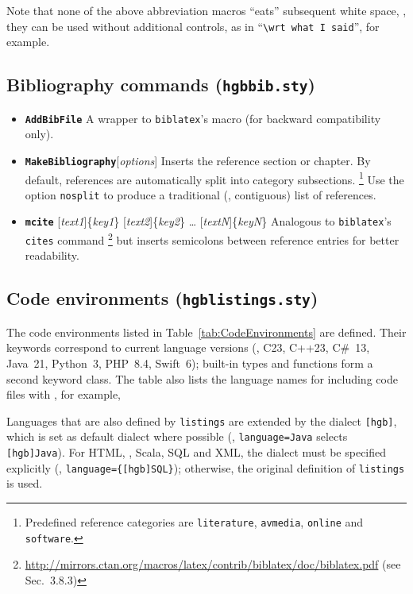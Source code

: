 \documentclass[language=english]{hgbarticle}
\begin{document}
\noindent
Note that none of the above abbreviation macros ``eats'' subsequent white
space, \ie, they can be used without additional controls, as in
``\verb!\wrt what I said!'', for example.

\subsection{Bibliography commands (\texttt{hgbbib.sty})}

\begin{itemize}
    \item 
    \textbf{\texttt{{\bs}AddBibFile}}\newline
    A wrapper to \texttt{biblatex}'s \verb!! macro (for backward compatibility only).
    \item
    \textbf{\texttt{{\bs}MakeBibliography}}[\emph{options}]
    \newline
    Inserts the
    reference section or chapter. By default, references are automatically
    split into category subsections.%
    \footnote{Predefined reference categories are \texttt{literature},
        \texttt{avmedia}, \texttt{online} and \texttt{software}.}
    Use the option \texttt{nosplit} to produce a traditional (\ie,
    contiguous) list of references.
    \item
    \textbf{\texttt{{\bs}mcite}}%
        [\emph{text1}]\{\emph{key1}\}%
        [\emph{text2}]\{\emph{key2}\}%
        \ldots
        [\emph{textN}]\{\emph{keyN}\}%
    \newline
    Analogous to \texttt{bib\-la\-tex}'s \texttt{{\bs}cites} command%
    \footnote{%
    \url{http://mirrors.ctan.org/macros/latex/contrib/biblatex/doc/biblatex.pdf}
    (see Sec.~3.8.3)} but inserts semicolons between reference entries for
    better readability.
\end{itemize}



\subsection{Code environments (\texttt{hgblistings.sty})}
\label{sec:CodeEnvironments}

The code environments listed in Table~\ref{tab:CodeEnvironments} are defined. Their keywords correspond
to current language versions (\eg, C23, C++23, C\#~13, Java~21, Python~3, PHP~8.4, Swift~6); built-in
types and functions form a second keyword class. The table also lists the language names for
including code files with \verb!!, for example,
%
\begin{LaTeXCode}[numbers=none]

\end{LaTeXCode}
%
Languages that are also defined by \texttt{listings} are extended by the dialect \texttt{[hgb]}, which is
set as default dialect where possible (\eg, \texttt{language=Java} selects \texttt{[hgb]Java}). For HTML,
\latex, Scala, SQL and XML, the dialect must be specified explicitly (\eg, \texttt{language=\{[hgb]SQL\}});
otherwise, the original definition of \texttt{listings} is used.
\end{document}
